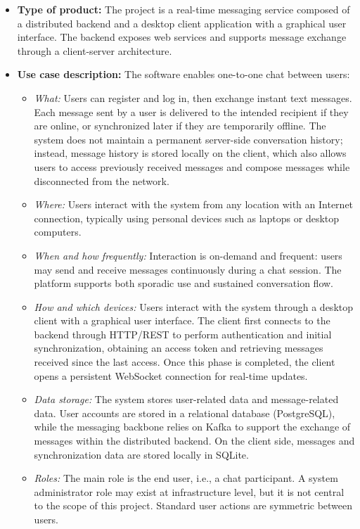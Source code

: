 \documentclass{scrartcl}
\begin{document}
\begin{itemize}
	\item \textbf{Type of product:} The project is a real-time messaging service composed of a distributed backend and a desktop client application with a graphical user interface. The backend exposes web services and supports message exchange through a client-server architecture.
	
	\item \textbf{Use case description:} The software enables one-to-one chat between users:
	\begin{itemize}
		\item \emph{What:} Users can register and log in, then exchange instant text messages. Each message sent by a user is delivered to the intended recipient if they are online, or synchronized later if they are temporarily offline. The system does not maintain a permanent server-side conversation history; instead, message history is stored locally on the client, which also allows users to access previously received messages and compose messages while disconnected from the network.
		\item \emph{Where:} Users interact with the system from any location with an Internet connection, typically using personal devices such as laptops or desktop computers.
		\item \emph{When and how frequently:} Interaction is on-demand and frequent: users may send and receive messages continuously during a chat session. The platform supports both sporadic use and sustained conversation flow.
		\item \emph{How and which devices:} Users interact with the system through a desktop client with a graphical user interface. The client first connects to the backend through HTTP/REST to perform authentication and initial synchronization, obtaining an access token and retrieving messages received since the last access. Once this phase is completed, the client opens a persistent WebSocket connection for real-time updates.
		\item \emph{Data storage:} The system stores user-related data and message-related data. User accounts are stored in a relational database (PostgreSQL), while the messaging backbone relies on Kafka to support the exchange of messages within the distributed backend. On the client side, messages and synchronization data are stored locally in SQLite.
		\item \emph{Roles:} The main role is the end user, i.e., a chat participant. A system administrator role may exist at infrastructure level, but it is not central to the scope of this project. Standard user actions are symmetric between users.
	\end{itemize}
	

\end{itemize}
\end{document}
